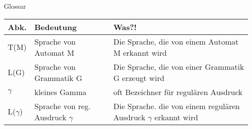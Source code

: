 \begin{frame}[fragile]{Glossar}
	\small
	\begin{tabular}{p{} p{} p{}}
		\toprule
		Abk.        & Bedeutung                          & Was?!                                                               \\
		\midrule
		T(M)        & Sprache von Automat M              & Die Sprache, die von einem Automat M erkannt wird                   \\
		L(G)        & Sprache von Grammatik G            & Die Sprache, die von einer Grammatik G erzeugt wird                 \\
		$\gamma$    & kleines Gamma                      & oft Bezeichner für regulären Ausdruck                               \\
		L($\gamma$) & Sprache von reg. Ausdruck $\gamma$ & Die Sprache. die von einem regulären Ausdruck $\gamma$ erkannt wird \\
		\bottomrule
	\end{tabular}
\end{frame}